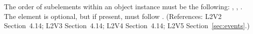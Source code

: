 The order of subelements within an \Event object instance must be
the following: , ,
.  The  element is
optional, but if present, must follow .
(References: L2V2 Section~4.14; L2V3 Section~4.14; L2V4 Section~4.14; L2V5 Section~\ref{sec:events}.)
